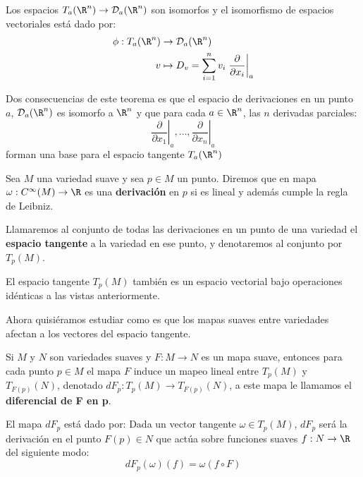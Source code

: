 \begin{frame}
\begin{theorem}
  Los espacios $T_a(\R^n) \to \mathcal{D}_a(\R^n)$ son isomorfos y el isomorfismo de espacios vectoriales está dado por:
\begin{align*}
  \phi: T_a(\R^n) &\to \mathcal{D}_a(\R^n)\\
  v &\mapsto D_v = \sum_{i=1}^n v_i \left. \frac{\partial}{\partial x_i} \right|_{a}
\end{align*}
\end{theorem}\pause

  Dos consecuencias de este teorema es que el espacio de derivaciones en un punto $a$, $\mathcal{D}_a(\R^n)$ es isomorfo a $\R^n$ y que para cada $a \in \R^n$, las $n$ derivadas parciales:
  \[
    \left. \frac{\partial}{\partial x_1} \right|_a,
    \dots,
    \left. \frac{\partial}{\partial x_n} \right|_a
  \]
  forman una base para el espacio tangente $T_a(\R^n)$
\end{frame}

\begin{frame}
\begin{definition}
  Sea $M$ una variedad suave y sea $p \in M$ un punto. Diremos que en mapa $\omega: C^{\infty}(M) \to \R$ es una \textbf{derivación} en $p$ si es lineal y además cumple la regla de Leibniz.

  Llamaremos al conjunto de todas las derivaciones en un punto de una variedad el \textbf{espacio tangente} a la variedad en ese punto, y denotaremos al conjunto por $T_p(M)$.
\end{definition}\pause

  El espacio tangente $T_p(M)$ también es un espacio vectorial bajo operaciones idénticas a las vistas anteriormente.
\end{frame}

\begin{frame}
  Ahora quisiéramos estudiar como es que los mapas suaves entre variedades afectan a los vectores del espacio tangente.

  \begin{definition}
    Si $M$ y $N$ son variedades suaves y $F: M \to N$ es un mapa suave, entonces para cada punto $p \in M$ el mapa $F$ induce un mapeo lineal entre $T_p(M)$ y $T_{F(p)}(N)$, denotado $dF_p: T_p(M) \to T_{F(p)}(N)$, a este mapa le llamamos el \textbf{diferencial de F en p}.

    El mapa $dF_p$ está dado por: Dada un vector tangente $\omega \in T_p(M)$, $dF_p$ será la derivación en el punto $F(p) \in N$ que actúa sobre funciones suaves $f: N \to \R$ del siguiente modo:
    \[
      dF_p(\omega)(f) = \omega(f \circ F)
    \]
  \end{definition}
\end{frame}

